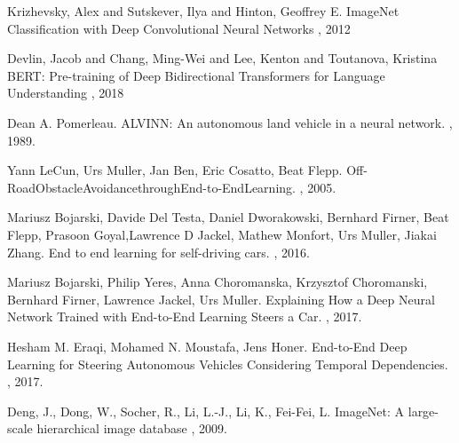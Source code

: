
  


\begin{thebibliography}{1}


Krizhevsky, Alex and Sutskever, Ilya and Hinton, Geoffrey E.
\newblock ImageNet Classification with Deep Convolutional Neural Networks
, 2012

Devlin, Jacob and Chang, Ming-Wei and Lee, Kenton and Toutanova, Kristina
\newblock BERT: Pre-training of Deep Bidirectional Transformers for Language Understanding
, 2018

Dean A. Pomerleau.
\newblock ALVINN: An autonomous land vehicle in a neural network.
, 1989.

Yann LeCun, Urs Muller, Jan Ben, Eric Cosatto, Beat Flepp.
\newblock Off-RoadObstacleAvoidancethroughEnd-to-EndLearning.
, 2005.

Mariusz Bojarski, Davide Del Testa, Daniel Dworakowski, Bernhard Firner, Beat Flepp, Prasoon Goyal,Lawrence D Jackel, Mathew Monfort, Urs Muller, Jiakai Zhang.
\newblock End  to  end  learning  for  self-driving  cars.
, 2016.

Mariusz Bojarski, Philip Yeres, Anna Choromanska, Krzysztof Choromanski, Bernhard Firner, Lawrence Jackel, Urs Muller. 
\newblock Explaining How a Deep Neural Network Trained with End-to-End Learning Steers a Car.
, 2017.

Hesham M. Eraqi, Mohamed N. Moustafa, Jens Honer.
\newblock End-to-End Deep Learning for Steering Autonomous Vehicles Considering Temporal Dependencies.
, 2017.

Deng, J., Dong, W., Socher, R., Li, L.-J., Li, K., Fei-Fei, L.
\newblock ImageNet: A large-scale hierarchical image database
, 2009.


\end{thebibliography}
